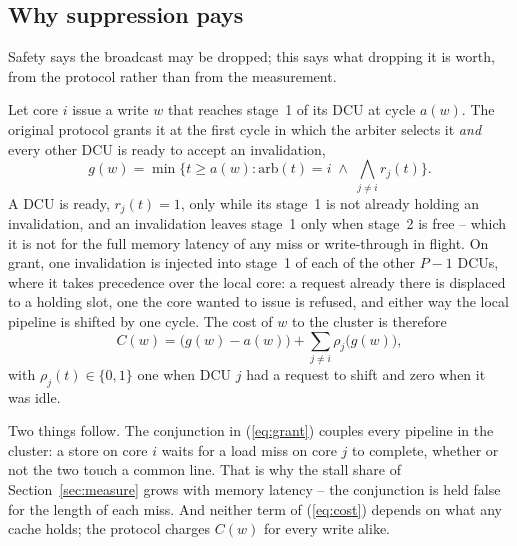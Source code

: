 \subsection{Why suppression pays}
\label{sec:model}

Safety says the broadcast may be dropped; this says what dropping it is worth,
from the protocol rather than from the measurement.

Let core $i$ issue a write $w$ that reaches stage~1 of its DCU at cycle $a(w)$.
The original protocol grants it at the first cycle in which the arbiter selects
it \emph{and} every other DCU is ready to accept an invalidation,
\begin{equation}
g(w) = \min\Big\{t \ge a(w) : \mathrm{arb}(t) = i \;\wedge\; \textstyle\bigwedge_{j \ne i} r_j(t)\Big\}.
\label{eq:grant}
\end{equation}
A DCU is ready, $r_j(t) = 1$, only while its stage~1 is not already holding an
invalidation, and an invalidation leaves stage~1 only when stage~2 is free --
which it is not for the full memory latency of any miss or write-through in
flight. On grant, one invalidation is injected into stage~1 of each of the other
$P{-}1$ DCUs, where it takes precedence over the local core: a request already
there is displaced to a holding slot, one the core wanted to issue is refused,
and either way the local pipeline is shifted by one cycle. The cost of $w$ to
the cluster is therefore
\begin{equation}
C(w) = \big(g(w) - a(w)\big) + \sum_{j \ne i} \rho_j\big(g(w)\big),
\label{eq:cost}
\end{equation}
with $\rho_j(t) \in \{0, 1\}$ one when DCU $j$ had a request to shift and zero
when it was idle.

Two things follow. The conjunction in (\ref{eq:grant}) couples every pipeline
in the cluster: a store on core $i$ waits for a load miss on core $j$ to
complete, whether or not the two touch a common line. That is why the stall
share of Section~\ref{sec:measure} grows with memory latency -- the conjunction
is held false for the length of each miss. And neither term of (\ref{eq:cost})
depends on what any cache holds; the protocol charges $C(w)$ for every write
alike.

